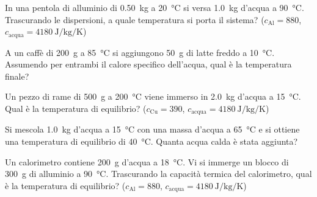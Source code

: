 \begin{esercizio}
In una pentola di alluminio di \SI{0,50}{\kilogram} a \SI{20}{\celsius} si versa \SI{1,0}{\kilogram} d'acqua a \SI{90}{\celsius}. Trascurando le dispersioni, a quale temperatura si porta il sistema? ($c_{\text{Al}} = 880$, $c_{\text{acqua}} = \SI{4180}{\joule\per\kilogram\per\kelvin}$)\\
\end{esercizio}

\begin{esercizio}
A un caffè di \SI{200}{\gram} a \SI{85}{\celsius} si aggiungono \SI{50}{\gram} di latte freddo a \SI{10}{\celsius}. Assumendo per entrambi il calore specifico dell'acqua, qual è la temperatura finale?\\
\end{esercizio}

\begin{esercizio}
Un pezzo di rame di \SI{500}{\gram} a \SI{200}{\celsius} viene immerso in \SI{2,0}{\kilogram} d'acqua a \SI{15}{\celsius}. Qual è la temperatura di equilibrio? ($c_{\text{Cu}} = 390$, $c_{\text{acqua}} = \SI{4180}{\joule\per\kilogram\per\kelvin}$)\\
\end{esercizio}

\begin{esercizio}
Si mescola \SI{1,0}{\kilogram} d'acqua a \SI{15}{\celsius} con una massa d'acqua a \SI{65}{\celsius} e si ottiene una temperatura di equilibrio di \SI{40}{\celsius}. Quanta acqua calda è stata aggiunta?\\
\end{esercizio}

\begin{esercizio}
Un calorimetro contiene \SI{200}{\gram} d'acqua a \SI{18}{\celsius}. Vi si immerge un blocco di \SI{300}{\gram} di alluminio a \SI{90}{\celsius}. Trascurando la capacità termica del calorimetro, qual è la temperatura di equilibrio? ($c_{\text{Al}} = 880$, $c_{\text{acqua}} = \SI{4180}{\joule\per\kilogram\per\kelvin}$)\\
\end{esercizio}

